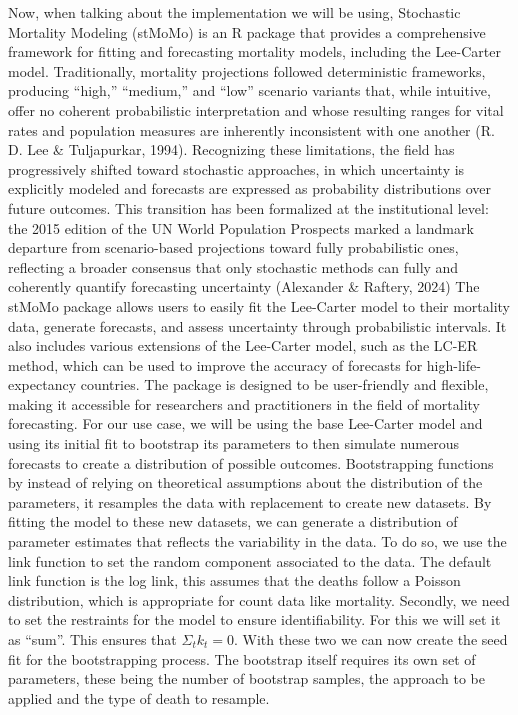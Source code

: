 \documentclass[
  12pt,
]{report}
\begin{document}
Now, when talking about the implementation we will be using, Stochastic
Mortality Modeling (stMoMo) is an R package that provides a
comprehensive framework for fitting and forecasting mortality models,
including the Lee-Carter model. Traditionally, mortality projections
followed deterministic frameworks, producing ``high,'' ``medium,'' and
``low'' scenario variants that, while intuitive, offer no coherent
probabilistic interpretation and whose resulting ranges for vital rates
and population measures are inherently inconsistent with one another (R.
D. Lee \& Tuljapurkar, 1994). Recognizing these limitations, the field
has progressively shifted toward stochastic approaches, in which
uncertainty is explicitly modeled and forecasts are expressed as
probability distributions over future outcomes. This transition has been
formalized at the institutional level: the 2015 edition of the UN World
Population Prospects marked a landmark departure from scenario-based
projections toward fully probabilistic ones, reflecting a broader
consensus that only stochastic methods can fully and coherently quantify
forecasting uncertainty (Alexander \& Raftery, 2024) The stMoMo package
allows users to easily fit the Lee-Carter model to their mortality data,
generate forecasts, and assess uncertainty through probabilistic
intervals. It also includes various extensions of the Lee-Carter model,
such as the LC-ER method, which can be used to improve the accuracy of
forecasts for high-life-expectancy countries. The package is designed to
be user-friendly and flexible, making it accessible for researchers and
practitioners in the field of mortality forecasting. For our use case,
we will be using the base Lee-Carter model and using its initial fit to
bootstrap its parameters to then simulate numerous forecasts to create a
distribution of possible outcomes. Bootstrapping functions by instead of
relying on theoretical assumptions about the distribution of the
parameters, it resamples the data with replacement to create new
datasets. By fitting the model to these new datasets, we can generate a
distribution of parameter estimates that reflects the variability in the
data. To do so, we use the link function to set the random component
associated to the data. The default link function is the log link, this
assumes that the deaths follow a Poisson distribution, which is
appropriate for count data like mortality. Secondly, we need to set the
restraints for the model to ensure identifiability. For this we will set
it as ``sum''. This ensures that \(\Sigma_t k_t=0\). With these two we
can now create the seed fit for the bootstrapping process. The bootstrap
itself requires its own set of parameters, these being the number of
bootstrap samples, the approach to be applied and the type of death to
resample.
\end{document}
